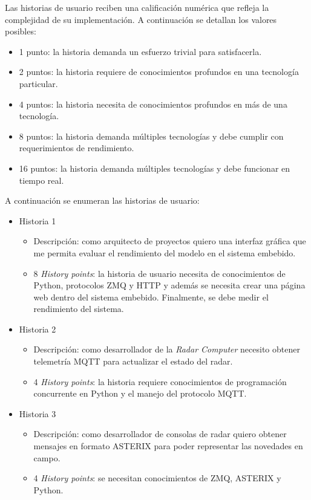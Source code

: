 \documentclass[
11pt, %
]{charter}
\begin{document}
Las historias de usuario reciben una calificación numérica que refleja la
complejidad de su implementación.
A continuación se detallan los valores posibles:

\begin{itemize}
\item 1 punto: la historia demanda un esfuerzo trivial para satisfacerla.
\item 2 puntos: la historia requiere de conocimientos profundos en una
  tecnología particular.
\item 4 puntos: la historia necesita de conocimientos profundos en más de una tecnología.
\item 8 puntos: la historia demanda múltiples tecnologías y debe cumplir con
  requerimientos de rendimiento.
\item 16 puntos: la historia demanda múltiples tecnologías y debe funcionar en
  tiempo real.
\end{itemize}

A continuación se enumeran las historias de usuario:

\begin{itemize}
  \item Historia 1
    \begin{itemize}
      \item Descripción: como arquitecto de proyectos quiero una interfaz gráfica que me permita
        evaluar el rendimiento del modelo en el sistema embebido.
      \item 8 \emph{History points}: la historia de usuario necesita de
        conocimientos de Python, protocolos ZMQ y HTTP y además se necesita crear
        una página web dentro del sistema embebido. Finalmente, se debe medir el
        rendimiento del sistema.
    \end{itemize}
  \item Historia 2
    \begin{itemize}
      \item Descripción: como desarrollador de la \emph{Radar Computer} necesito obtener
        telemetría MQTT para actualizar el estado del radar.
      \item 4 \emph{History points}: la historia requiere conocimientos de
        programación concurrente en Python y el manejo del protocolo MQTT.
    \end{itemize}
  \item Historia 3
    \begin{itemize}
      \item Descripción: como desarrollador de consolas de radar quiero obtener mensajes en
        formato ASTERIX para poder representar las novedades en campo.
      \item 4 \emph{History points}: se necesitan conocimientos de ZMQ, ASTERIX
        y Python.
    \end{itemize}
\end{itemize}
\end{document}
